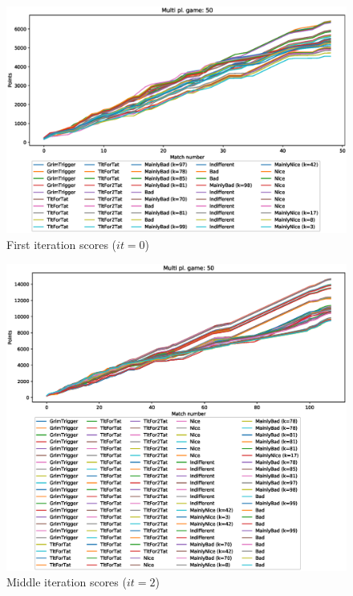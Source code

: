 \documentclass[journal,10pt,twoside]{IEEEtran}
\begin{document}
\begin{figure}[!ht]
    \centering
    \includegraphics[width=1\columnwidth]{../img/ripdmp-incr/ripdmp-scores-increasing-pop-50-r0}
    \caption{First iteration scores ($it=0$)}
    \label{fig:incrFI}
\end{figure}

\begin{figure}[!ht]
    \centering
    \includegraphics[width=1\columnwidth]{../img/ripdmp-incr/ripdmp-scores-increasing-pop-50-r2}
    \caption{Middle iteration scores ($it=2$)}
    \label{fig:incrMI}
\end{figure}
\end{document}
